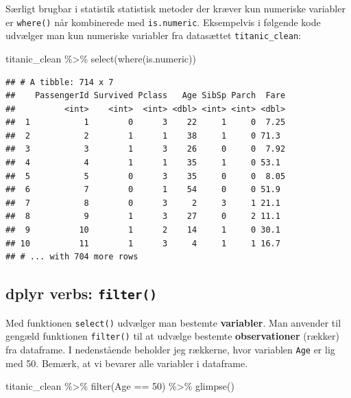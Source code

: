 \documentclass[
]{book}
\newenvironment{Shaded}{\begin{snugshade}}{\end{snugshade}}
\newcommand{\DecValTok}[1]{\textcolor[rgb]{0.00,0.00,0.81}{#1}}
\newcommand{\FunctionTok}[1]{\textcolor[rgb]{0.00,0.00,0.00}{#1}}
\newcommand{\NormalTok}[1]{#1}
\newcommand{\SpecialCharTok}[1]{\textcolor[rgb]{0.00,0.00,0.00}{#1}}
\begin{document}
Særligt brugbar i statistik statistisk metoder der kræver kun numeriske variabler er \texttt{where()} når kombinerede med \texttt{is.numeric}. Eksempelvis i følgende kode udvælger man kun numeriske variabler fra datasættet \texttt{titanic\_clean}:

\begin{Shaded}
\begin{Highlighting}[]
\NormalTok{titanic\_clean }\SpecialCharTok{\%\textgreater{}\%} \FunctionTok{select}\NormalTok{(}\FunctionTok{where}\NormalTok{(is.numeric))}
\end{Highlighting}
\end{Shaded}

\begin{verbatim}
## # A tibble: 714 x 7
##    PassengerId Survived Pclass   Age SibSp Parch  Fare
##          <int>    <int>  <int> <dbl> <int> <int> <dbl>
##  1           1        0      3    22     1     0  7.25
##  2           2        1      1    38     1     0 71.3 
##  3           3        1      3    26     0     0  7.92
##  4           4        1      1    35     1     0 53.1 
##  5           5        0      3    35     0     0  8.05
##  6           7        0      1    54     0     0 51.9 
##  7           8        0      3     2     3     1 21.1 
##  8           9        1      3    27     0     2 11.1 
##  9          10        1      2    14     1     0 30.1 
## 10          11        1      3     4     1     1 16.7 
## # ... with 704 more rows
\end{verbatim}

\hypertarget{dplyr-verbs-filter}{%
\subsection{\texorpdfstring{dplyr verbs: \texttt{filter()}}{dplyr verbs: filter()}}\label{dplyr-verbs-filter}}

Med funktionen \texttt{select()} udvælger man bestemte \textbf{variabler}. Man anvender til gengæld funktionen \texttt{filter()} til at udvælge bestemte \textbf{observationer} (rækker) fra dataframe. I nedenstående beholder jeg rækkerne, hvor variablen \texttt{Age} er lig med 50. Bemærk, at vi bevarer alle variabler i dataframe.

\begin{Shaded}
\begin{Highlighting}[]
\NormalTok{titanic\_clean }\SpecialCharTok{\%\textgreater{}\%} 
  \FunctionTok{filter}\NormalTok{(Age }\SpecialCharTok{==} \DecValTok{50}\NormalTok{) }\SpecialCharTok{\%\textgreater{}\%}
  \FunctionTok{glimpse}\NormalTok{()}
\end{Highlighting}
\end{Shaded}
\end{document}
